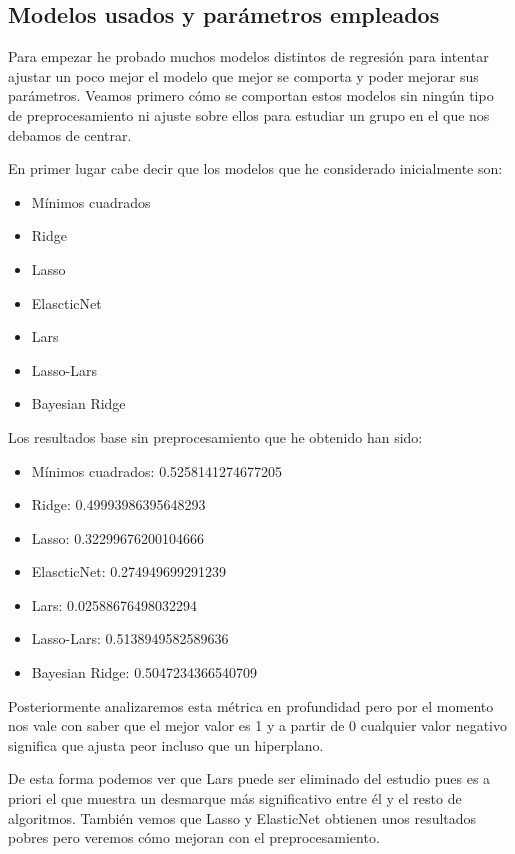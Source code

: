 \documentclass[12pt,a4paper]{article}
\begin{document}
\subsection{Modelos usados y parámetros empleados}

Para empezar he probado muchos modelos distintos de regresión para intentar ajustar un poco mejor el modelo que mejor se comporta y poder mejorar sus parámetros. Veamos primero cómo se comportan estos modelos sin ningún tipo de preprocesamiento ni ajuste sobre ellos para estudiar un grupo en el que nos debamos de centrar.

En primer lugar cabe decir que los modelos que he considerado inicialmente son:

\begin{itemize}
	\item Mínimos cuadrados
	\item Ridge
	\item Lasso
	\item ElascticNet
	\item Lars
	\item Lasso-Lars
	\item Bayesian Ridge
\end{itemize}

Los resultados base sin preprocesamiento que he obtenido han sido:

\begin{itemize}
	\item Mínimos cuadrados: 0.5258141274677205
	\item Ridge: 0.49993986395648293
	\item Lasso: 0.32299676200104666
	\item ElascticNet: 0.274949699291239
	\item Lars: 0.02588676498032294
	\item Lasso-Lars: 0.5138949582589636
	\item Bayesian Ridge: 0.5047234366540709
\end{itemize}

Posteriormente analizaremos esta métrica en profundidad pero por el momento nos vale con saber que el mejor valor es 1 y a partir de 0 cualquier valor negativo significa que ajusta peor incluso que un hiperplano. 

De esta forma podemos ver que Lars puede ser eliminado del estudio pues es a priori el que muestra un desmarque más significativo entre él y el resto de algoritmos. También vemos que Lasso y ElasticNet obtienen unos resultados pobres pero veremos cómo mejoran con el preprocesamiento.
\end{document}
